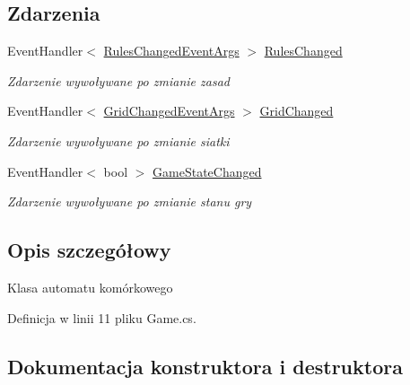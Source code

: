 \subsection*{Zdarzenia}
\begin{DoxyCompactItemize}
\item 
Event\+Handler$<$ \hyperlink{class_convay_1_1_core_1_1_rules_changed_event_args}{Rules\+Changed\+Event\+Args} $>$ \hyperlink{class_convay_1_1_core_1_1_game_a505038e37e1687fafcf5f304254e18db}{Rules\+Changed}
\begin{DoxyCompactList}\small\item\em Zdarzenie wywoływane po zmianie zasad \end{DoxyCompactList}\item 
Event\+Handler$<$ \hyperlink{class_convay_1_1_core_1_1_grid_changed_event_args}{Grid\+Changed\+Event\+Args} $>$ \hyperlink{class_convay_1_1_core_1_1_game_ae2338714ffd4c5ff33dd8a67e0d7d573}{Grid\+Changed}
\begin{DoxyCompactList}\small\item\em Zdarzenie wywoływane po zmianie siatki \end{DoxyCompactList}\item 
Event\+Handler$<$ bool $>$ \hyperlink{class_convay_1_1_core_1_1_game_ab88c319349721a3a8e2a4e17ef2d60e6}{Game\+State\+Changed}
\begin{DoxyCompactList}\small\item\em Zdarzenie wywoływane po zmianie stanu gry \end{DoxyCompactList}\end{DoxyCompactItemize}


\subsection{Opis szczegółowy}
Klasa automatu komórkowego 



Definicja w linii 11 pliku Game.\+cs.



\subsection{Dokumentacja konstruktora i destruktora}
\hypertarget{class_convay_1_1_core_1_1_game_a6a97d86b561918a025ea1df73c86eee0}{}\label{class_convay_1_1_core_1_1_game_a6a97d86b561918a025ea1df73c86eee0} 
